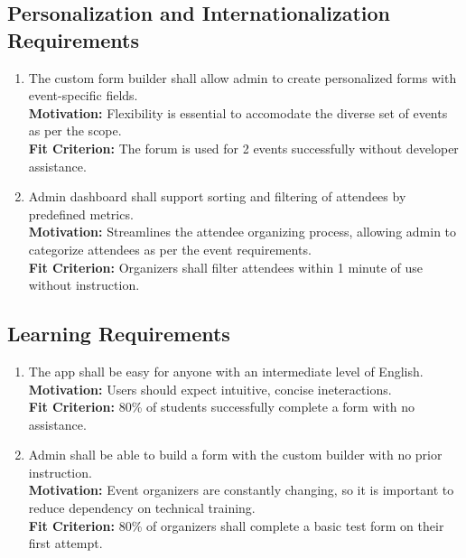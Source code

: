 \documentclass[12pt]{article}
\begin{document}
\subsection{Personalization and Internationalization Requirements}
\begin{enumerate}[label=UHR-PIR.\arabic*, wide=0pt, leftmargin=*]
  \item The custom form builder shall allow admin to create personalized forms with event-specific fields.\\[2mm]
    {\bf Motivation:} Flexibility is essential to accomodate the diverse set of events as per the scope.\\
    {\bf Fit Criterion:} The forum is used for 2 events successfully without developer assistance.
  \item Admin dashboard shall support sorting and filtering of attendees by predefined metrics.\\[2mm]
    {\bf Motivation:} Streamlines the attendee organizing process, allowing admin to categorize attendees as per the event requirements.\\
    {\bf Fit Criterion:} Organizers shall filter attendees within 1 minute of use without instruction.
\end{enumerate}

\subsection{Learning Requirements}
\begin{enumerate}[label=UHR-LR.\arabic*, wide=0pt, leftmargin=*]
  \item The app shall be easy for anyone with an intermediate level of English.\\[2mm]
    {\bf Motivation:} Users should expect intuitive, concise ineteractions.\\
    {\bf Fit Criterion:} 80\% of students successfully complete a form with no assistance.
  \item Admin shall be able to build a form with the custom builder with no prior instruction.\\[2mm]
    {\bf Motivation:} Event organizers are constantly changing, so it is important to reduce dependency on technical training.\\
    {\bf Fit Criterion:} 80\% of organizers shall complete a basic test form on their first attempt.
\end{enumerate}
\end{document}
